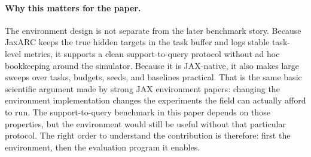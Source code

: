 \paragraph{Why this matters for the paper.} The environment design is not separate from the later benchmark story. Because JaxARC keeps the true hidden targets in the task buffer and logs stable task-level metrics, it supports a clean support-to-query protocol without ad hoc bookkeeping around the simulator. Because it is JAX-native, it also makes large sweeps over tasks, budgets, seeds, and baselines practical. That is the same basic scientific argument made by strong JAX environment papers: changing the environment implementation changes the experiments the field can actually afford to run. The support-to-query benchmark in this paper depends on those properties, but the environment would still be useful without that particular protocol. The right order to understand the contribution is therefore: first the environment, then the evaluation program it enables.
